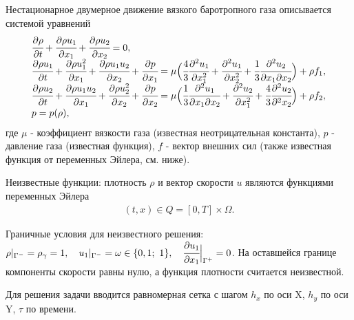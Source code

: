 

Нестационарное двумерное движение вязкого баротропного газа описывается системой уравнений
$$
\begin{array}{l}
\cfrac{\partial \rho}{\partial t} + \cfrac{\partial \rho u_1}{\partial x_1}+ \cfrac{\partial \rho u_2}{\partial x_2} = 0, \\
\cfrac{\partial \rho u_1}{\partial t} + \cfrac{\partial \rho u_1^2}{\partial x_1} + \cfrac{\partial \rho u_1 u_2}{\partial x_2} 
	+ \cfrac{\partial p}{\partial x_1} 
	= \mu \Big(\cfrac{4}{3}\cfrac{\partial^2 u_1}{\partial x_1^2} + \cfrac{\partial^2 u_1}{\partial x_2^2}
	+  \cfrac{1}{3}\cfrac{\partial^2 u_2}{\partial x_1\partial x_2} \Big) + \rho f_1, \\
\cfrac{\partial \rho u_2}{\partial t} + \cfrac{\partial \rho u_1 u_2}{\partial x_1} + \cfrac{\partial \rho u_2^2}{\partial x_2}
	+ \cfrac{\partial p}{\partial x_2} 
	= \mu \Big(\cfrac{1}{3}\cfrac{\partial^2 u_1}{\partial x_1\partial x_2} + \cfrac{\partial^2 u_2}{\partial x_1^2}
	+  \cfrac{4}{3}\cfrac{\partial^2 u_2}{\partial^2 x_2} \Big) + \rho f_2, \\
p = p (\rho),
\end{array}
$$
где $\mu$ - коэффициент вязкости газа (известная неотрицательная константа), $p$ - давление газа (известная функция), $f$ - вектор внешних сил
(также известная функция от переменных Эйлера, см. ниже).

Неизвестные функции: плотность $\rho$ и вектор скорости $u$ являются функциями переменных Эйлера 
\begin{gather*}
(t, x) \in Q = [0, T] \times \Omega.
\end{gather*}

Граничные условия для неизвестного решения: $\rho|_{\Gamma^-} = \rho_{\gamma} = 1,\quad u_1|_{\Gamma^-} = \omega \in \{0,1;\  1\},\quad \cfrac{\partial u_1}{\partial x_1}\Big|_{\Gamma^+} = 0$. На оставшейся границе компоненты скорости равны нулю, а функция плотности считается неизвестной.

Для решения задачи вводится равномерная сетка с шагом $h_x$ по оси X, $h_y$ по оси Y, $\tau$ по времени.
